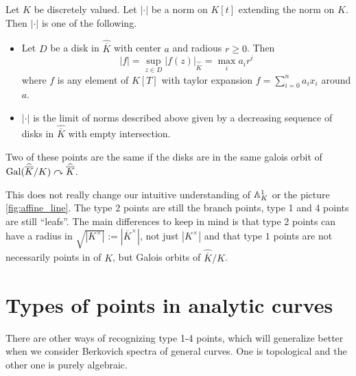 \begin{proposition}
	Let $K$ be discretely valued. 
	Let $|\cdot |$ be a norm on $K[t]$ extending the norm on $K$. 
	Then $|\cdot |$ is one of the following.
	\begin{itemize}
		\item  Let $D$ be a disk in $\hat{\overline{K}}$ with center $a$ and radious $r  \ge 0$. 
			Then \[
				|f| = \sup_{z \in D} |f(z)|_{\hat{\overline{K}}} = \max_i a_i r^{i}
			\] 
			where $f$ is any element of $K[T]$ with taylor expansion $f = \sum_{i = 0}^{n} a_i x_i$ around $a$. 
		\item $|\cdot |$ is the limit of norms described above given by a decreasing sequence of disks in $\hat{\overline{K}}$ with empty intersection. 
	\end{itemize}
	Two of these points are the same if the disks are in the same galois orbit of $\operatorname{Gal}(\widehat{\overline{K}} / K) \curvearrowright \widehat{\overline{K}}$.  
\end{proposition}

This does not really change our intuitive understanding of $\mathbb{A}_{K}^{1}$ or the picture \cref{fig:affine_line}. 
The type 2 points are still the branch points, type 1 and 4 points are still ``leafs''.
The main differences to keep in mind is that type 2 points can have a radius in $\sqrt{|K^{\times }|} := |\overline{K}^{\times }|$, not just $|K^{\times }|$ and that type $1$ points are not necessarily points in of $K$, but Galois orbits of $\hat{\overline{K}} / K$. 




\section{Types of points in analytic curves} \label{sec:types_of_points_in_analytic_curves}
There are other ways of recognizing type 1-4 points, which will generalize better when we consider Berkovich spectra of general curves.
One is topological and the other one is purely algebraic. 

